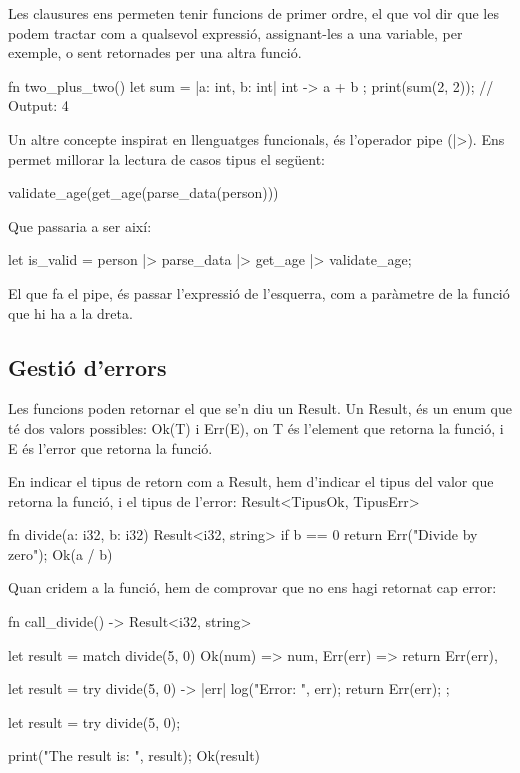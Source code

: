 ﻿\documentclass{article}
\begin{document}
Les clausures ens permeten tenir funcions de primer ordre, el que vol dir que
les podem tractar com a qualsevol expressió, assignant-les a una variable, per 
exemple, o sent retornades per una altra funció.

\begin{code}
fn two_plus_two() {
    let sum = |a: int, b: int| int -> {
        a + b
    };
    print(sum(2, 2)); // Output: 4
}
\end{code}

Un altre concepte inspirat en llenguatges funcionals, és l'operador pipe (|>). 
Ens permet millorar la lectura de casos tipus el següent:

\begin{code}
validate_age(get_age(parse_data(person)))
\end{code}

Que passaria a ser així:

\begin{code}
let is_valid = 
    person
    |> parse_data
    |> get_age
    |> validate_age;
\end{code}

El que fa el pipe, és passar l'expressió de l'esquerra, com a paràmetre de la
funció que hi ha a la dreta.

\subsection{Gestió d'errors}

Les funcions poden retornar el que se'n diu un Result. Un Result, és un enum
que té dos valors possibles: {\ttfamily Ok(T) i Err(E)}, on T és l'element que retorna la
funció, i E és l'error que retorna la funció.

En indicar el tipus de retorn com a Result, hem d'indicar el tipus del valor que
retorna la funció, i el tipus de l'error: {\ttfamily Result<TipusOk, TipusErr> }

\begin{code}
fn divide(a: i32, b: i32) Result<i32, string> {
    if b == 0 {
        return Err("Divide by zero");
    }
    Ok(a / b)
}
\end{code}

Quan cridem a la funció, hem de comprovar que no ens hagi retornat cap error:

\begin{code}
fn call_divide() -> Result<i32, string> {
    let result = match divide(5, 0) {
        Ok(num) => num,
        Err(err) => return Err(err),
    }

    let result = try divide(5, 0) -> |err| {
        log("Error: ", err);
        return Err(err);
    };

    let result = try divide(5, 0);

    print("The result is: ", result);
    Ok(result)
}
\end{code}
\end{document}
